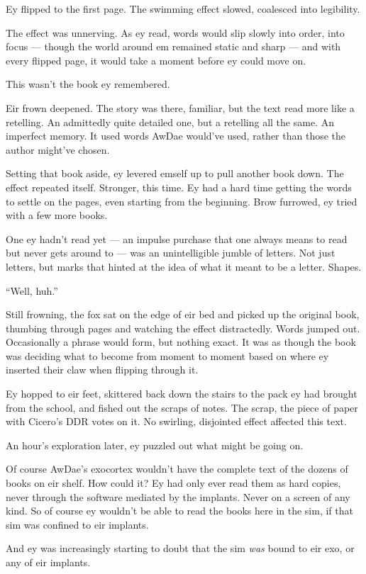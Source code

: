 Ey flipped to the first page. The swimming effect slowed, coalesced into legibility.

The effect was unnerving. As ey read, words would slip slowly into order, into focus — though the world around em remained static and sharp — and with every flipped page, it would take a moment before ey could move on.

This wasn't the book ey remembered.

Eir frown deepened. The story was there, familiar, but the text read more like a retelling. An admittedly quite detailed one, but a retelling all the same. An imperfect memory. It used words AwDae would've used, rather than those the author might've chosen.

Setting that book aside, ey levered emself up to pull another book down. The effect repeated itself. Stronger, this time. Ey had a hard time getting the words to settle on the pages, even starting from the beginning. Brow furrowed, ey tried with a few more books.

One ey hadn't read yet — an impulse purchase that one always means to read but never gets around to — was an unintelligible jumble of letters. Not just letters, but marks that hinted at the idea of what it meant to be a letter. Shapes.

``Well, huh.''

Still frowning, the fox sat on the edge of eir bed and picked up the original book, thumbing through pages and watching the effect distractedly. Words jumped out. Occasionally a phrase would form, but nothing exact. It was as though the book was deciding what to become from moment to moment based on where ey inserted their claw when flipping through it.

Ey hopped to eir feet, skittered back down the stairs to the pack ey had brought from the school, and fished out the scraps of notes. The scrap, the piece of paper with Cicero's DDR votes on it. No swirling, disjointed effect affected this text.

An hour's exploration later, ey puzzled out what might be going on.

Of course AwDae's exocortex wouldn't have the complete text of the dozens of books on eir shelf. How could it? Ey had only ever read them as hard copies, never through the software mediated by the implants. Never on a screen of any kind. So of course ey wouldn't be able to read the books here in the sim, if that sim was confined to eir implants.

And ey was increasingly starting to doubt that the sim \emph{was} bound to eir exo, or any of eir implants.

